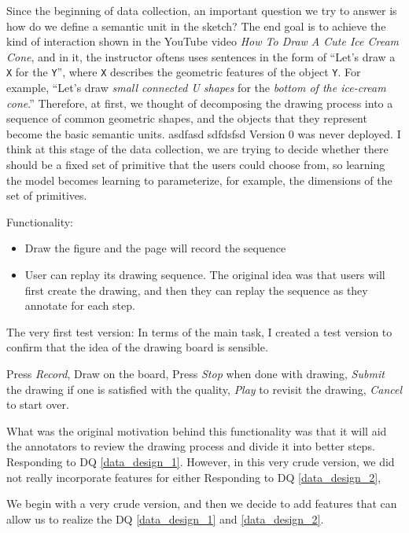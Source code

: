 Since the beginning of data collection, an important question we try to answer is how do we define a semantic unit in the sketch?  
The end goal is to achieve the kind of interaction shown in the YouTube video \textit{How To Draw A Cute Ice Cream Cone}, and in it, the instructor oftens uses sentences in the form of ``Let's draw a \texttt{X} for the \texttt{Y}'', where \texttt{X} describes the geometric features of the object \texttt{Y}. For example, ``Let's draw \textit{small connected U shapes} for the \textit{bottom of the ice-cream cone}.'' Therefore, at first, we thought of decomposing the drawing process into a sequence of common geometric shapes, and the objects that they represent become the basic semantic units.      
asdfasd sdfdsfsd
Version 0 was never deployed. I think at this stage of the data collection, we are trying to decide whether there should be a fixed set of primitive that the users could choose from, so learning the model becomes learning to parameterize, for example, the dimensions of the set of primitives. 

Functionality:
\begin{itemize}
    \item Draw the figure and the page will record the sequence 
    \item User can replay its drawing sequence. The original idea was that users will first create the drawing, and then they can replay the sequence as they annotate for each step. 
\end{itemize}

The very first test version:
In terms of the main task, I created a test version to confirm that the idea of the drawing board is sensible.

Press \textit{Record}, Draw on the board, Press \textit{Stop} when done with drawing, \textit{Submit} the drawing if one is satisfied with the quality, \textit{Play} to revisit the drawing, \textit{Cancel} to start over. 

What was the original motivation behind this functionality was that it will aid the annotators to review the drawing process and divide it into better steps. Responding to DQ \ref{data_design_1}. 
However, in this very crude version, we did not really incorporate features for either 
Responding to DQ \ref{data_design_2}, 

We begin with a very crude version, and then we decide to add features that can allow us to realize the DQ \ref{data_design_1} and \ref{data_design_2}.

